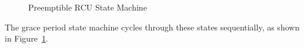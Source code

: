 \begin{figure}[htb]
\begin{center}
\end{center}
\caption{Preemptible RCU State Machine}
\label{app:rcuimpl:Preemptible RCU State Machine}
\end{figure}

The grace period state machine cycles through these states sequentially,
as shown in
Figure~\ref{app:rcuimpl:Preemptible RCU State Machine}.

